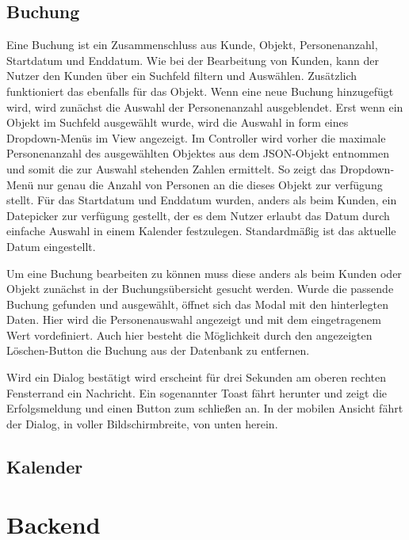 \subsection{Buchung}
Eine Buchung ist ein Zusammenschluss aus Kunde, Objekt, Personenanzahl, Startdatum und Enddatum. Wie bei der Bearbeitung von Kunden, kann der Nutzer den Kunden über ein Suchfeld filtern und Auswählen. Zusätzlich funktioniert das ebenfalls für das Objekt.
Wenn eine neue Buchung hinzugefügt wird, wird zunächst die Auswahl der Personenanzahl ausgeblendet. Erst wenn ein Objekt im Suchfeld ausgewählt wurde, wird die Auswahl in form eines Dropdown-Menüs im View angezeigt. Im Controller wird vorher die maximale Personenanzahl des ausgewählten Objektes aus dem JSON-Objekt entnommen und somit die zur Auswahl stehenden Zahlen ermittelt. So zeigt das Dropdown-Menü nur genau die Anzahl von Personen an die dieses Objekt zur verfügung stellt. Für das Startdatum und Enddatum wurden, anders als beim Kunden, ein Datepicker zur verfügung gestellt, der es dem Nutzer erlaubt das Datum durch einfache Auswahl in einem Kalender festzulegen. Standardmäßig ist das aktuelle Datum eingestellt.

Um eine Buchung bearbeiten zu können muss diese anders als beim Kunden oder Objekt zunächst in der Buchungsübersicht gesucht werden. Wurde die passende Buchung gefunden und ausgewählt, öffnet sich das Modal mit den hinterlegten Daten. Hier wird die Personenauswahl angezeigt und mit dem eingetragenem Wert vordefiniert. Auch hier besteht die Möglichkeit durch den angezeigten Löschen-Button die Buchung aus der Datenbank zu entfernen.

Wird ein Dialog bestätigt wird erscheint für drei Sekunden am oberen rechten Fensterrand ein Nachricht. Ein sogenannter Toast fährt herunter und zeigt die Erfolgsmeldung und einen Button zum schließen an. In der mobilen Ansicht fährt der Dialog, in voller Bildschirmbreite, von unten herein.

\subsection{Kalender}


\section{Backend}
